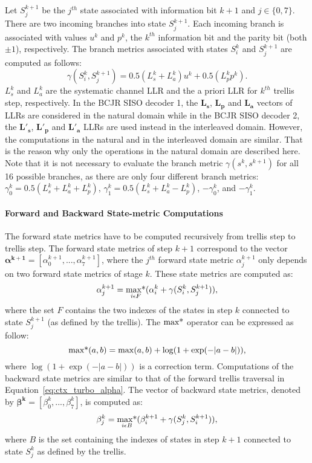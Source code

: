 Let $S_j^{k+1}$ be the $j^{th}$ state associated with information bit $k+1$ and
$j \in \{0,7\}$. There are two incoming branches into state $S_j^{k+1}$. Each
incoming branch is associated with values $u^k$ and $p^k$, the $k^{th}$
information bit and the parity bit (both $\pm1$), respectively. The branch
metrics associated with states $S_i^k$ and $S_j^{k+1}$ are computed as follows:
\begin{equation}
\label{eq:ctx_turbo_gamma}
 \gamma(S_i^k, S_j^{k+1}) = 0.5(L_{s}^k + L_a^k)u^k + 0.5(L_p^k p^k).
\end{equation}
$L_{s}^k$ and $L_a^k$ are the systematic channel LLR and the a priori LLR for
$k^{th}$ trellis step, respectively. In the BCJR SISO decoder 1, the
$\bm{L_{s}}$, $\bm{L_{p}}$ and $\bm{L_{a}}$ vectors of LLRs are considered
in the natural domain while in the BCJR SISO decoder 2, the $\bm{L'_{s}}$,
$\bm{L'_{p}}$ and $\bm{L'_{a}}$ LLRs are used instead in the interleaved domain.
However, the computations in the natural and in the interleaved domain are
similar. That is the reason why only the operations in the natural domain are
described here. Note that it is not necessary to evaluate the branch metric
$\gamma(s^k , s^{k+1})$ for all 16 possible branches, as there are only four
different branch metrics: $\gamma^k_0 = 0.5(L_{s}^k + L_a^k + L_p^k)$,
$\gamma^k_1 = 0.5(L_{s}^k + L_a^k - L_p^k)$, $-\gamma^k_0$, and $-\gamma^k_1$.

\paragraph{Forward and Backward State-metric Computations}

The forward state metrics have to be computed recursively from trellis step to
trellis step. The forward state metrics of step $k+1$ correspond to the vector
$\bm{\alpha^{k+1}} = [\alpha_0^{k+1}, ... ,\alpha_7^{k+1}]$, where the
$j^{th}$ forward state metric $\alpha_j^{k+1}$ only depends on two forward
state metrics of stage $k$. These state metrics are computed as:
\begin{equation}
  \label{eq:ctx_turbo_alpha}
  \alpha_j^{k+1} =
  \operatorname*{max*}_{i \epsilon F} ( \alpha_i^k + \gamma(S_i^k, S_j^{k+1}) ),
\end{equation}
where the set $F$ contains the two indexes of the states in step $k$ connected
to state $S_j^{k+1}$ (as defined by the trellis). The $\operatorname*{max*}$ operator can be
expressed as follow:
\begin{equation}
   \operatorname*{max*}(a,b) = \max(a,b) + \log(1 + \exp(-|a-b|)),
\end{equation}
where $\log(1 + \exp(-|a-b|))$ is a correction term.
Computations of the backward state metrics are similar to that of the forward
trellis traversal in Equation~\ref{eq:ctx_turbo_alpha}. The vector of backward
state metrics, denoted by $\bm{\beta^k} = [\beta_0^k, ..., \beta_7^k]$, is
computed as:
\begin{equation}
  \label{eq:ctx_turbo_beta}
  \beta_j^k =
  \operatorname*{max*}_{i \epsilon B} ( \beta_i^{k+1} + \gamma(S_j^k, S_i^{k+1}) ),
\end{equation}
where $B$ is the set containing the indexes of states in step $k+1$ connected to
state $S_j^k$ as defined by the trellis.

